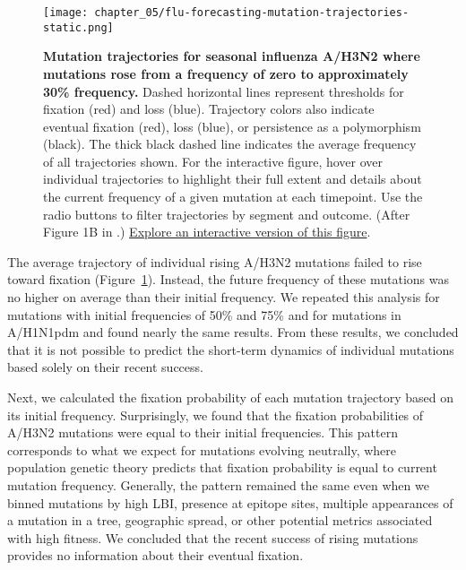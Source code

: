 \begin{figure}
  \centering
  \texttt{[image: chapter\_05/flu-forecasting-mutation-trajectories-static.png]}
  \caption[{Mutation trajectories for seasonal influenza A/H3N2 where mutations rose from a frequency of zero to approximately 30\% frequency.}]{{\bf Mutation trajectories for seasonal influenza A/H3N2 where mutations rose from a frequency of zero to approximately 30\% frequency.}
    Dashed horizontal lines represent thresholds for fixation (red) and loss (blue).
    Trajectory colors also indicate eventual fixation (red), loss (blue), or persistence as a polymorphism (black).
    The thick black dashed line indicates the average frequency of all trajectories shown.
    For the interactive figure, hover over individual trajectories to highlight their full extent and details about the current frequency of a given mutation at each timepoint.
    Use the radio buttons to filter trajectories by segment and outcome.
    (After Figure 1B in \citet{Barrat-Charlaix2020}.)
    \href{https://bedford.io/blog/predicting-seasonal-influenza-evolution/\#mutation-trajectories}{Explore an interactive version of this figure}.\label{fig:mutation-trajectories} }
\end{figure}

The average trajectory of individual rising A/H3N2 mutations failed to rise toward fixation (Figure~\ref{fig:mutation-trajectories}).
Instead, the future frequency of these mutations was no higher on average than their initial frequency.
We repeated this analysis for mutations with initial frequencies of 50\% and 75\% and for mutations in A/H1N1pdm and found nearly the same results.
From these results, we concluded that it is not possible to predict the short-term dynamics of individual mutations based solely on their recent success.

Next, we calculated the fixation probability of each mutation trajectory based on its initial frequency.
Surprisingly, we found that the fixation probabilities of A/H3N2 mutations were equal to their initial frequencies.
This pattern corresponds to what we expect for mutations evolving neutrally, where population genetic theory predicts that fixation probability is equal to current mutation frequency.
Generally, the pattern remained the same even when we binned mutations by high LBI, presence at epitope sites, multiple appearances of a mutation in a tree, geographic spread, or other potential metrics associated with high fitness.
We concluded that the recent success of rising mutations provides no information about their eventual fixation.

